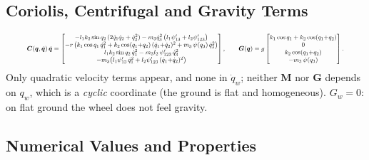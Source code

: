 \documentclass[11pt,a4paper]{article}
\newcommand{\bq}{\bm{q}}
\newcommand{\bdq}{\dot{\bm{q}}}
\newcommand{\bM}{\bm{M}}
\newcommand{\bC}{\bm{C}}
\newcommand{\bG}{\bm{G}}
\begin{document}
\subsection{Coriolis, Centrifugal and Gravity Terms}

\begin{equation}
    \resizebox{0.92\linewidth}{!}{$\displaystyle
    \bC(\bq,\bdq)\,\bdq=\begin{bmatrix}
    -l_1k_2\sin q_2\,(2\dot q_1\dot q_2+\dot q_2^2) - m_3\dot q_3^2\,\big(l_1\psi'_{13}+l_2\psi'_{123}\big)\\
    -r\,\big(k_1\cos q_1\,\dot q_1^2 + k_2\cos(q_1{+}q_2)\,(\dot q_1{+}\dot q_2)^2 + m_3\,\psi(q_3)\,\dot q_3^2\big)\\
    l_1k_2\sin q_2\,\dot q_1^2 - m_3 l_2\,\psi'_{123}\,\dot q_3^2\\
    -m_3\big(l_1\psi'_{13}\,\dot q_1^2 + l_2\psi'_{123}\,(\dot q_1{+}\dot q_2)^2\big)
    \end{bmatrix},
    \qquad
    \bG(\bq)=g\begin{bmatrix}
    k_1\cos q_1 + k_2\cos(q_1{+}q_2)\\ 0\\ k_2\cos(q_1{+}q_2)\\ -m_3\,\psi(q_3)
    \end{bmatrix}.
    $}
\end{equation}
Only quadratic velocity terms appear, and none in $\dot q_w$; neither $\bM$ nor $\bG$ depends on
$q_w$, which is a \emph{cyclic} coordinate (the ground is flat and homogeneous).  $G_w = 0$: on
flat ground the wheel does not feel gravity.

\subsection{Numerical Values and Properties}
\end{document}
